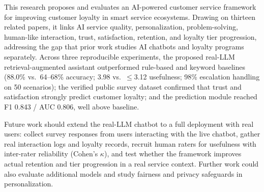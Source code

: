 \documentclass[runningheads]{llncs}
\begin{document}
This research proposes and evaluates an AI-powered customer service framework for improving customer loyalty in smart service ecosystems. Drawing on thirteen related papers, it links AI service quality, personalization, problem-solving, human-like interaction, trust, satisfaction, retention, and loyalty tier progression, addressing the gap that prior work studies AI chatbots and loyalty programs separately. Across three reproducible experiments, the proposed real-LLM retrieval-augmented assistant outperformed rule-based and keyword baselines (88.0\% vs.\ 64--68\% accuracy; 3.98 vs.\ $\le$3.12 usefulness; 98\% escalation handling on 50 scenarios); the verified public survey dataset confirmed that trust and satisfaction strongly predict customer loyalty; and the prediction module reached F1 0.843 / AUC 0.806, well above baseline.

Future work should extend the real-LLM chatbot to a full deployment with real users: collect survey responses from users interacting with the live chatbot, gather real interaction logs and loyalty records, recruit human raters for usefulness with inter-rater reliability (Cohen's $\kappa$), and test whether the framework improves actual retention and tier progression in a real service context. Further work could also evaluate additional models and study fairness and privacy safeguards in personalization.
\end{document}
